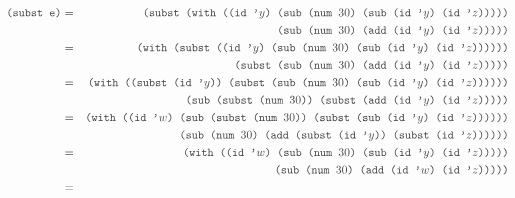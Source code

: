 \begin{eqnarray*}
  \code{(subst e)} &=& \code{(subst (with ((id '$y$) (sub (num $30$) (sub (id '$y$) (id '$z$)))))}\\
  & & \code{(sub (num $30$) (add (id '$y$) (id '$z$)))))}\\
  &=& \code{(with (subst ((id '$y$) (sub (num $30$) (sub (id '$y$) (id '$z$))))))}\\
  & & \code{(subst (sub (num $30$) (add (id '$y$) (id '$z$)))))}\\
  &=& \code{(with ((subst (id '$y$)) (subst (sub (num $30$) (sub (id '$y$) (id '$z$))))))}\\
  & & \code{(sub (subst (num $30$)) (subst (add (id '$y$) (id '$z$)))))}\\
  &=& \code{(with ((id '$w$) (sub (subst (num $30$)) (subst (sub (id '$y$) (id '$z$))))))}\\
  & & \code{(sub (num $30$) (add (subst (id '$y$)) (subst (id '$z$))))))}\\
  &=& \code{(with ((id '$w$) (sub (num $30$) (sub (id '$y$) (id '$z$)))))}\\
  & & \code{(sub (num $30$) (add (id '$w$) (id '$z$)))))}\\
  &=&
\end{eqnarray*}
